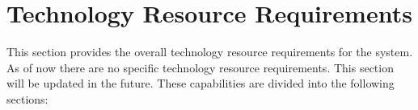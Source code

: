 \KNEADSECTIONNEWPAGE
\section{Technology Resource Requirements}
\label{lab:sec_TechnologyResourceRequirements}
% 

This section provides the overall technology resource requirements for the system. As of now there are no specific technology resource requirements. This section will be updated in the future.
These capabilities are divided into the following sections:


